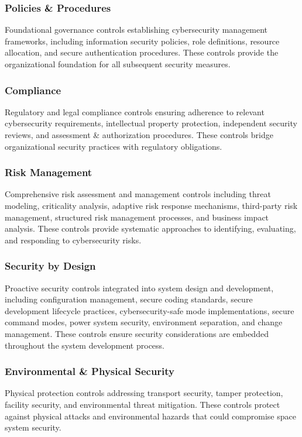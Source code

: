 \documentclass[binding=0.6cm]{sapthesis}
\begin{document}
\subsubsection{Policies \& Procedures}
Foundational governance controls establishing cybersecurity management frameworks, including information security policies, role definitions, resource allocation, and secure authentication procedures. These controls provide the organizational foundation for all subsequent security measures.

\subsubsection{Compliance}
Regulatory and legal compliance controls ensuring adherence to relevant cybersecurity requirements, intellectual property protection, independent security reviews, and assessment \& authorization procedures. These controls bridge organizational security practices with regulatory obligations.

\subsubsection{Risk Management}
Comprehensive risk assessment and management controls including threat modeling, criticality analysis, adaptive risk response mechanisms, third-party risk management, structured risk management processes, and business impact analysis. These controls provide systematic approaches to identifying, evaluating, and responding to cybersecurity risks.

\subsubsection{Security by Design}
Proactive security controls integrated into system design and development, including configuration management, secure coding standards, secure development lifecycle practices, cybersecurity-safe mode implementations, secure command modes, power system security, environment separation, and change management. These controls ensure security considerations are embedded throughout the system development process.

\subsubsection{Environmental \& Physical Security}
Physical protection controls addressing transport security, tamper protection, facility security, and environmental threat mitigation. These controls protect against physical attacks and environmental hazards that could compromise space system security.
\end{document}
